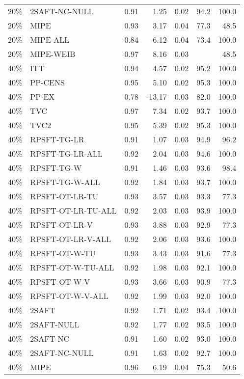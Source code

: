 \begin{table}[ht]
{\begin{tabular}{llrrrrr}
  20\% & 2SAFT-NC-NULL & 0.91 & 1.25 & 0.02 & 94.2 & 100.0 \\ 
  20\% & MIPE & 0.93 & 3.17 & 0.04 & 77.3 & 48.5 \\ 
  20\% & MIPE-ALL & 0.84 & -6.12 & 0.04 & 73.4 & 100.0 \\ 
  20\% & MIPE-WEIB & 0.97 & 8.16 & 0.03 &  & 48.5 \\ 
   \hline
40\% & ITT & 0.94 & 4.57 & 0.02 & 95.2 & 100.0 \\ 
  40\% & PP-CENS & 0.95 & 5.10 & 0.02 & 95.3 & 100.0 \\ 
  40\% & PP-EX & 0.78 & -13.17 & 0.03 & 82.0 & 100.0 \\ 
  40\% & TVC & 0.97 & 7.34 & 0.02 & 93.7 & 100.0 \\ 
  40\% & TVC2 & 0.95 & 5.39 & 0.02 & 95.3 & 100.0 \\ 
   \hline
40\% & RPSFT-TG-LR & 0.91 & 1.07 & 0.03 & 94.9 & 96.2 \\ 
  40\% & RPSFT-TG-LR-ALL & 0.92 & 2.04 & 0.03 & 94.6 & 100.0 \\ 
  40\% & RPSFT-TG-W & 0.91 & 1.46 & 0.03 & 93.6 & 98.4 \\ 
  40\% & RPSFT-TG-W-ALL & 0.92 & 1.84 & 0.03 & 93.7 & 100.0 \\ 
  40\% & RPSFT-OT-LR-TU & 0.93 & 3.57 & 0.03 & 93.3 & 77.3 \\ 
  40\% & RPSFT-OT-LR-TU-ALL & 0.92 & 2.03 & 0.03 & 93.9 & 100.0 \\ 
  40\% & RPSFT-OT-LR-V & 0.93 & 3.88 & 0.03 & 92.9 & 77.3 \\ 
  40\% & RPSFT-OT-LR-V-ALL & 0.92 & 2.06 & 0.03 & 93.6 & 100.0 \\ 
   \hline
40\% & RPSFT-OT-W-TU & 0.93 & 3.43 & 0.03 & 91.6 & 77.3 \\ 
  40\% & RPSFT-OT-W-TU-ALL & 0.92 & 1.98 & 0.03 & 92.1 & 100.0 \\ 
  40\% & RPSFT-OT-W-V & 0.93 & 3.66 & 0.03 & 90.9 & 77.3 \\ 
  40\% & RPSFT-OT-W-V-ALL & 0.92 & 1.99 & 0.03 & 92.0 & 100.0 \\ 
   \hline
40\% & 2SAFT & 0.92 & 1.71 & 0.02 & 93.4 & 100.0 \\ 
  40\% & 2SAFT-NULL & 0.92 & 1.77 & 0.02 & 93.5 & 100.0 \\ 
  40\% & 2SAFT-NC & 0.91 & 1.60 & 0.02 & 93.0 & 100.0 \\ 
  40\% & 2SAFT-NC-NULL & 0.91 & 1.63 & 0.02 & 92.7 & 100.0 \\ 
  40\% & MIPE & 0.96 & 6.19 & 0.04 & 75.3 & 50.6 \\ 

\end{tabular}}
\end{table}
